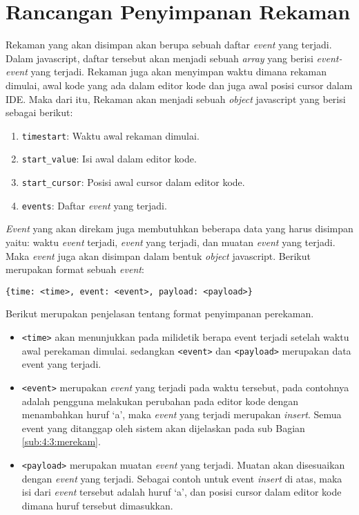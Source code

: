 \section{Rancangan Penyimpanan Rekaman}
\label{sec:4:2:storerekaman}

Rekaman yang akan disimpan akan berupa sebuah daftar \textit{event} yang terjadi. Dalam javascript, daftar tersebut akan menjadi sebuah \textit{array} yang berisi \textit{event-event} yang terjadi. Rekaman juga akan menyimpan waktu dimana rekaman dimulai, awal kode yang ada dalam editor kode dan juga awal posisi cursor dalam IDE. Maka dari itu, Rekaman akan menjadi sebuah \textit{object} javascript yang berisi sebagai berikut:

\begin{enumerate}
    \item \verb|timestart|: Waktu awal rekaman dimulai.
    \item \verb|start_value|: Isi awal dalam editor kode.
    \item \verb|start_cursor|: Posisi awal cursor dalam editor kode.
    \item \verb|events|: Daftar \textit{event} yang terjadi.
\end{enumerate}

\textit{Event} yang akan direkam juga membutuhkan beberapa data yang harus disimpan yaitu: waktu \textit{event} terjadi, \textit{event} yang terjadi, dan muatan \textit{event} yang terjadi. Maka \textit{event} juga akan disimpan dalam bentuk \textit{object} javascript. Berikut merupakan format sebuah \textit{event}:

\begin{center}
    \verb|{time: <time>, event: <event>, payload: <payload>}|
\end{center}

Berikut merupakan penjelasan tentang format penyimpanan perekaman.

\begin{itemize}
    \item \verb|<time>| akan menunjukkan pada milidetik berapa event terjadi setelah waktu awal perekaman dimulai. sedangkan \verb|<event>| dan \verb|<payload>| merupakan data event yang terjadi.
    
    \item \verb|<event>| merupakan \textit{event} yang terjadi pada waktu tersebut, pada contohnya adalah pengguna melakukan perubahan pada editor kode dengan menambahkan huruf `a', maka \textit{event} yang terjadi merupakan \textit{insert}. Semua event yang ditanggap oleh sistem akan dijelaskan pada sub Bagian \ref{sub:4:3:merekam}.
    
    \item \verb|<payload>| merupakan muatan \textit{event} yang terjadi. Muatan akan disesuaikan dengan \textit{event} yang terjadi. Sebagai contoh untuk event \textit{insert} di atas, maka isi dari \textit{event} tersebut adalah huruf `a', dan posisi cursor dalam editor kode dimana huruf tersebut dimasukkan.
\end{itemize}
    
